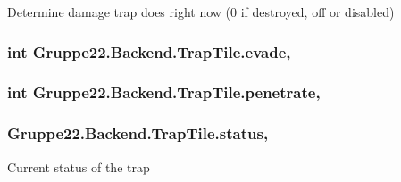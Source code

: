 Determine damage trap does right now (0 if destroyed, off or disabled) 

\hypertarget{class_gruppe22_1_1_backend_1_1_trap_tile_a04ee490b767680e638cc177c213d322e}{
\subsubsection[{evade}]{\setlength{\rightskip}{0pt plus 5cm}int Gruppe22.\-Backend.\-Trap\-Tile.\-evade\hspace{0.3cm}{\ttfamily [get]}, {\ttfamily [set]}}}\label{class_gruppe22_1_1_backend_1_1_trap_tile_a04ee490b767680e638cc177c213d322e}
\hypertarget{class_gruppe22_1_1_backend_1_1_trap_tile_a1d998440a070ca21b21803f653e23c8a}{
\subsubsection[{penetrate}]{\setlength{\rightskip}{0pt plus 5cm}int Gruppe22.\-Backend.\-Trap\-Tile.\-penetrate\hspace{0.3cm}{\ttfamily [get]}, {\ttfamily [set]}}}\label{class_gruppe22_1_1_backend_1_1_trap_tile_a1d998440a070ca21b21803f653e23c8a}
\hypertarget{class_gruppe22_1_1_backend_1_1_trap_tile_a503c06f82de3c82ec940c2fb1ed27ed7}{
\subsubsection[{status}]{ Gruppe22.\-Backend.\-Trap\-Tile.\-status\hspace{0.3cm}{\ttfamily [get]}, {\ttfamily [set]}}}\label{class_gruppe22_1_1_backend_1_1_trap_tile_a503c06f82de3c82ec940c2fb1ed27ed7}


Current status of the trap 

